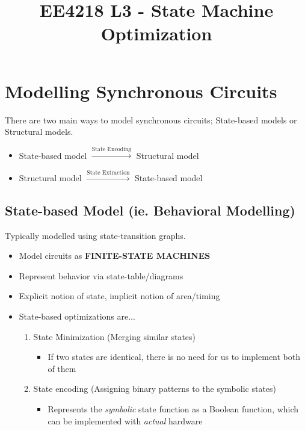 \documentclass{article}
\title{\vspace{-2cm} EE4218 L3 - State Machine Optimization}
\date{\vspace{-5ex}}
\begin{document}
\maketitle

\section{Modelling Synchronous Circuits}
There are two main ways to model synchronous circuits; State-based models or Structural models.
\begin{itemize}
    \item State-based model $\xrightarrow{\text{State Encoding}}$ Structural model
    \item Structural model $\xrightarrow{\text{State Extraction}}$ State-based model
\end{itemize}


\subsection{State-based Model (ie. Behavioral Modelling)}
Typically modelled using state-transition graphs.


\begin{itemize}
    \item Model circuits as \textbf{FINITE-STATE MACHINES}
    \item Represent behavior via state-table/diagrams
    \item Explicit notion of state, implicit notion of area/timing
    \item State-based optimizations are...
        \begin{enumerate}
            \item State Minimization (Merging similar states)
                \begin{itemize}
                    \item If two states are identical, there is no need for us to implement both of them
                \end{itemize}
            \item State encoding (Assigning binary patterns to the symbolic states)
                \begin{itemize}
                    \item Represents the \textit{symbolic} state function as a Boolean function, 
                          which can be implemented with \textit{actual} hardware
                \end{itemize}
        \end{enumerate}
\end{itemize}
\end{document}
